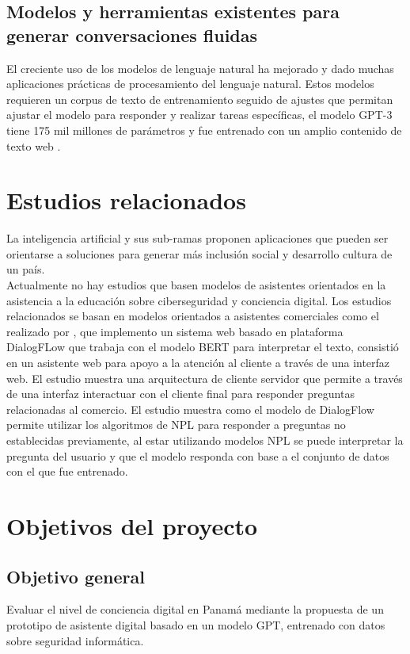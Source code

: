 \subsection{Modelos y herramientas existentes para generar conversaciones fluidas}\label{section: Revisión de la literatura}
El creciente uso de los modelos de lenguaje natural ha mejorado y dado muchas aplicaciones prácticas de procesamiento del lenguaje natural. Estos modelos requieren un corpus de texto de entrenamiento seguido de ajustes que permitan ajustar el modelo para responder y realizar tareas específicas, el modelo GPT-3 tiene 175 mil millones de parámetros y fue entrenado con un amplio contenido de texto web \cite{Brown2020}.  
\section{Estudios relacionados}\label{section: Estudios relacionados}
La inteligencia artificial y sus sub-ramas proponen aplicaciones que pueden ser orientarse a soluciones para generar más inclusión social y desarrollo cultura de un país. \\
Actualmente no hay estudios que basen modelos de asistentes orientados en la asistencia a la educación sobre ciberseguridad y conciencia digital. Los estudios relacionados se basan en modelos orientados a asistentes comerciales como el realizado por \cite{Eleannor2022}, que implemento un sistema web basado en plataforma DialogFLow que trabaja con el modelo BERT para interpretar el texto, consistió en un asistente web para apoyo a la atención al cliente a través de una interfaz web. El estudio muestra una arquitectura de cliente servidor que permite a través de una interfaz interactuar con el cliente final para responder preguntas relacionadas al comercio. El estudio muestra como el modelo de DialogFlow permite utilizar los algoritmos de NPL para responder a preguntas no establecidas previamente, al estar utilizando modelos NPL se puede interpretar la pregunta del usuario y que el modelo responda con base a el conjunto de datos con el que fue entrenado.
\section{Objetivos del proyecto}\label{section:Objetivos del proyecto}
\subsection{Objetivo general}\label{section:Objetivos del proyecto}
Evaluar el nivel de conciencia digital en Panamá mediante la propuesta  de un prototipo de asistente digital basado en un modelo GPT, entrenado con datos sobre seguridad informática.
